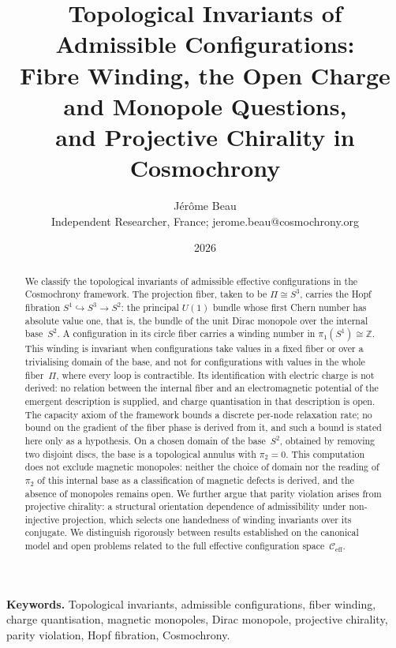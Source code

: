 \documentclass[11pt,a4paper]{article}
\title{Topological Invariants of Admissible Configurations:\\
Fibre Winding, the Open Charge and Monopole Questions,\\
and Projective Chirality in Cosmochrony}
\author{J\'er\^ome Beau\\
\small Independent Researcher, France; jerome.beau@cosmochrony.org}
\date{2026}
\newcommand{\Ceff}{\mathcal{C}_{\mathrm{eff}}}
\begin{document}
  \maketitle

  \begin{abstract}
    We classify the topological invariants of admissible effective configurations
    in the Cosmochrony framework.
    The projection fiber, taken to be $\Pi \cong S^3$, carries the Hopf fibration
    $S^1 \hookrightarrow S^3 \to S^2$: the principal $U(1)$ bundle whose first
    Chern number has absolute value one, that is, the bundle of the unit Dirac
    monopole over the internal base~$S^2$.
    A configuration in its circle fiber carries a winding number in
    $\pi_1(S^1) \cong \mathbb{Z}$.
    This winding is invariant when configurations take values in a fixed fiber
    or over a trivialising domain of the base, and not for configurations with
    values in the whole fiber~$\Pi$, where every loop is contractible.
    Its identification with electric charge is not derived: no relation between
    the internal fiber and an electromagnetic potential of the emergent
    description is supplied, and charge quantisation in that description is open.
    The capacity axiom of the framework bounds a discrete per-node relaxation
    rate; no bound on the gradient of the fiber phase is derived from it, and
    such a bound is stated here only as a hypothesis.
    On a chosen domain of the base~$S^2$, obtained by removing two disjoint
    discs, the base is a topological annulus with $\pi_2 = 0$.
    This computation does not exclude magnetic monopoles: neither the choice of
    domain nor the reading of $\pi_2$ of this internal base as a classification
    of magnetic defects is derived, and the absence of monopoles remains open.
    We further argue that parity violation arises from projective chirality:
    a structural orientation dependence of admissibility under non-injective
    projection, which selects one handedness of winding invariants over its
    conjugate.
    We distinguish rigorously between results established on the canonical
    model and open problems related to the full effective configuration
    space~$\Ceff$.
  \end{abstract}

  \smallskip\noindent
  \textbf{Keywords.}
  Topological invariants, admissible configurations, fiber winding,
  charge quantisation, magnetic monopoles, Dirac monopole, projective chirality,
  parity violation, Hopf fibration, Cosmochrony.
\end{document}
